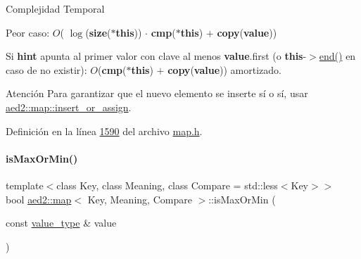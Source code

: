 \begin{DoxyDescription}
\item[Complejidad Temporal]
\begin{DoxyItemize}
\item Peor caso\+: $O$( $\log$({\bfseries size}({\bfseries $\ast$this})) $\cdot$ {\bfseries cmp}({\bfseries $\ast$this}) $+$ {\bfseries copy}({\bfseries value}))
\item Si {\bfseries hint} apunta al primer valor con clave al menos {\bfseries value}.first (o {\bfseries this}-\/$>$\hyperlink{classaed2_1_1map_a76023e6a56cb625513e1b5ea028bf983_a76023e6a56cb625513e1b5ea028bf983}{end()} en caso de no existir)\+: $O$({\bfseries cmp}({\bfseries $\ast$this}) $+$ {\bfseries copy}({\bfseries value})) amortizado. 
\end{DoxyItemize}
\end{DoxyDescription}

\begin{DoxyAttention}{Atención}
Para garantizar que el nuevo elemento se inserte sí o sí, usar \hyperlink{classaed2_1_1map_a2ef6723c183916276b0afc4a4c721475_a2ef6723c183916276b0afc4a4c721475}{aed2\+::map\+::insert\+\_\+or\+\_\+assign}. 
\end{DoxyAttention}


Definición en la línea \hyperlink{map_8h_source_l01590}{1590} del archivo \hyperlink{map_8h_source}{map.\+h}.

\mbox{\label{classaed2_1_1map_a81db4ead6daafe94938d5410173bdb6c_a81db4ead6daafe94938d5410173bdb6c}} 
\paragraph{\texorpdfstring{is\+Max\+Or\+Min()}{isMaxOrMin()}}
{\footnotesize\ttfamily template$<$class Key, class Meaning, class Compare = std\+::less$<$\+Key$>$$>$ \\
bool \hyperlink{classaed2_1_1map}{aed2\+::map}$<$ Key, Meaning, Compare $>$\+::is\+Max\+Or\+Min (\begin{DoxyParamCaption}\item[{const \hyperlink{classaed2_1_1map_a719db98e0ff9a837610f76be33264680_a719db98e0ff9a837610f76be33264680}{value\+\_\+type} \&}]{value }\end{DoxyParamCaption})\hspace{0.3cm}{\ttfamily [inline]}}




